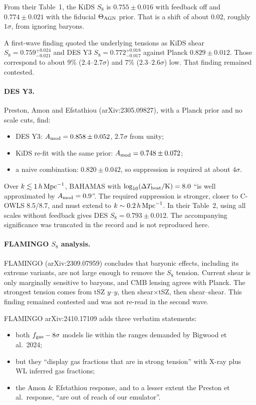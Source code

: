 \documentclass[11pt,a4paper]{article}
\begin{document}
From their Table~1, the KiDS $S_8$ is $0.755\pm0.016$ with feedback off and $0.774\pm0.021$ with the fiducial $\Theta_{\rm AGN}$ prior. That is a shift of about 0.02, roughly $1\sigma$, from ignoring baryons.

A first-wave finding quoted the underlying tensions as KiDS shear $S_8=0.759^{+0.024}_{-0.021}$ and DES Y3 $S_8=0.772^{+0.018}_{-0.017}$ against Planck $0.829\pm0.012$. Those correspond to about 9\% ($2.4$--$2.7\sigma$) and 7\% ($2.3$--$2.6\sigma$) low. That finding remained contested.

\paragraph{DES Y3.} Preston, Amon and Efstathiou (arXiv:2305.09827), with a Planck prior and no scale cuts, find:
\begin{itemize}
\item DES Y3: $A_{\rm mod}=0.858\pm0.052$, $2.7\sigma$ from unity;
\item KiDS re-fit with the same prior: $A_{\rm mod}=0.748\pm0.072$;
\item a naive combination: $0.820\pm0.042$, so suppression is required at about $4\sigma$.
\end{itemize}
Over $k\lesssim1\,h\,{\rm Mpc}^{-1}$, BAHAMAS with $\log_{10}(\Delta T_{\rm heat}/{\rm K})=8.0$ ``is well approximated by $A_{\rm mod} = 0.9$''. The required suppression is stronger, closer to C-OWLS 8.5/8.7, and must extend to $k\sim0.2\,h\,{\rm Mpc}^{-1}$. In their Table~2, using all scales without feedback gives DES $S_8=0.793\pm0.012$. The accompanying significance was truncated in the record and is not reproduced here.

\paragraph{FLAMINGO $S_8$ analysis.} FLAMINGO (arXiv:2309.07959) concludes that baryonic effects, including its extreme variants, are not large enough to remove the $S_8$ tension. Current shear is only marginally sensitive to baryons, and CMB lensing agrees with Planck. The strongest tension comes from tSZ $y$--$y$, then shear$\times$tSZ, then shear--shear. This finding remained contested and was not re-read in the second wave.

FLAMINGO arXiv:2410.17109 adds three verbatim statements:
\begin{itemize}
\item both $f_{\rm gas}-8\sigma$ models lie within the ranges demanded by Bigwood et al.\ 2024;
\item but they ``display gas fractions that are in strong tension'' with X-ray plus WL inferred gas fractions;
\item the Amon \& Efstathiou response, and to a lesser extent the Preston et al.\ response, ``are out of reach of our emulator''.
\end{itemize}
\end{document}
